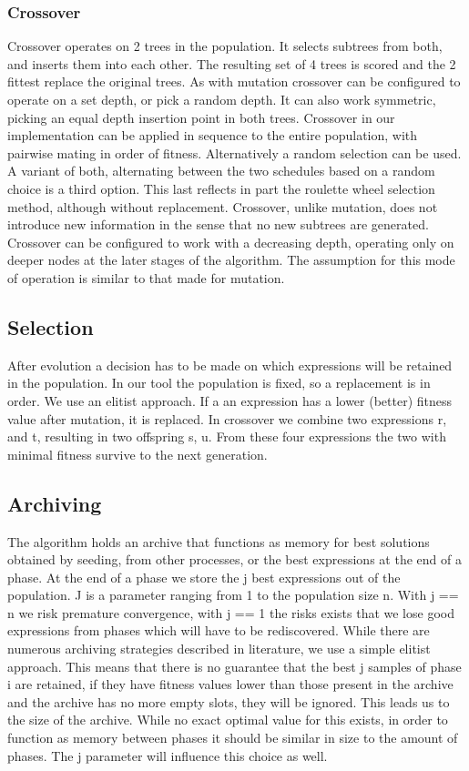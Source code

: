 \subsubsection{Crossover}
Crossover operates on 2 trees in the population. It selects subtrees from both, and inserts them into each other. The resulting set of 4 trees is scored and the 2 fittest replace the original trees. As with mutation crossover can be configured to operate on a set depth, or pick a random depth. It can also work symmetric, picking an equal depth insertion point in both trees.
Crossover in our implementation can be applied in sequence to the entire population, with pairwise mating in order of fitness. Alternatively a random selection can be used. A variant of both, alternating between the two schedules based on a random choice is a third option. This last reflects in part the roulette wheel selection method, although without replacement. %
Crossover, unlike mutation, does not introduce new information in the sense that no new subtrees are generated. 
Crossover can be configured to work with a decreasing depth, operating only on deeper nodes at the later stages of the algorithm. The assumption for this mode of operation is similar to that made for mutation. 

\subsection{Selection}
After evolution a decision has to be made on which expressions will be retained in the population. In our tool the population is fixed, so a replacement is in order. We use an elitist approach. If a an expression has a lower (better) fitness value after mutation, it is replaced. 
In crossover we combine two expressions r, and t, resulting in two offspring s, u. 
From these four expressions the two with minimal fitness survive to the next generation.

\subsection{Archiving}
The algorithm holds an archive that functions as memory for best solutions obtained by seeding, from other processes, or the best expressions at the end of a phase.
At the end of a phase we store the j best expressions out of the population. J is a parameter ranging from 1 to the population size n. With j == n we risk premature convergence, with j == 1 the risks exists that we lose good expressions from phases which will have to be rediscovered. 
While there are numerous archiving strategies described in literature, we use a simple elitist approach. This means that there is no guarantee that the best j samples of phase i are retained, if they have fitness values lower than those present in the archive and the archive has no more empty slots, they will be ignored.
This leads us to the size of the archive. While no exact optimal value for this exists, in order to function as memory between phases it should be similar in size to the amount of phases. The j parameter will influence this choice as well.

